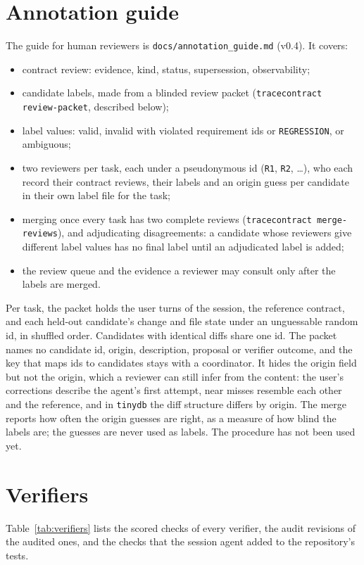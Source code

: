 \section{Annotation guide}
The guide for human reviewers is \texttt{docs/annotation\_guide.md} (v0.4). It covers:
\begin{itemize}
\item contract review: evidence, kind, status, supersession, observability;
\item candidate labels, made from a blinded review packet (\texttt{tracecontract review-packet}, described below);
\item label values: valid, invalid with violated requirement ids or \texttt{REGRESSION}, or ambiguous;
\item two reviewers per task, each under a pseudonymous id (\texttt{R1}, \texttt{R2}, \dots), who each record their contract reviews, their labels and an origin guess per candidate in their own label file for the task;
\item merging once every task has two complete reviews (\texttt{tracecontract merge-reviews}), and adjudicating disagreements: a candidate whose reviewers give different label values has no final label until an adjudicated label is added;
\item the review queue and the evidence a reviewer may consult only after the labels are merged.
\end{itemize}
Per task, the packet holds the user turns of the session, the reference contract, and each held-out candidate's change and file state under an unguessable random id, in shuffled order. Candidates with identical diffs share one id. The packet names no candidate id, origin, description, proposal or verifier outcome, and the key that maps ids to candidates stays with a coordinator. It hides the origin field but not the origin, which a reviewer can still infer from the content: the user's corrections describe the agent's first attempt, near misses resemble each other and the reference, and in \texttt{tinydb} the diff structure differs by origin. The merge reports how often the origin guesses are right, as a measure of how blind the labels are; the guesses are never used as labels. The procedure has not been used yet.

\section{Verifiers}
Table~\ref{tab:verifiers} lists the scored checks of every verifier, the audit revisions of the audited ones, and the checks that the session agent added to the repository's tests.

